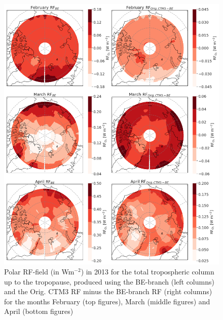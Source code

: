 \begin{figure}[ht]
    \centering
    \includegraphics[width = \linewidth]{Chapter6_Results/images/RF/RF_USE/BEOrig_RF_polar_FebApr_2013.png}
    \caption{Polar RF-field (in Wm$^{-2}$) in 2013 for the total tropospheric column up to the tropopause, produced using the BE-branch (left columns) and the Orig. CTM3 RF minus the BE-branch RF (right columns) for the months February (top figures), March (middle figures) and April (bottom figures)}
    \label{fig:BEorig_RF_polar_FebApr_2013}
\end{figure}